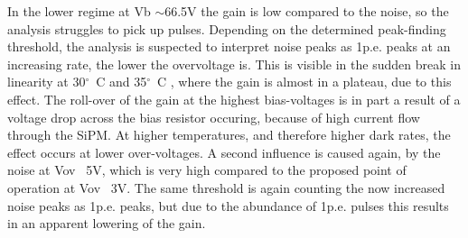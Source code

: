 \documentclass[12pt,article,type=msc,colorback,accentcolor=tud9c]{tudthesis}
\begin{document}
In the lower regime at Vb $\sim$66.5V the gain is low compared to the noise, so the analysis struggles to pick up pulses. Depending on the determined peak-finding threshold, the analysis is suspected to interpret noise peaks as 1p.e. peaks at an increasing rate, the lower the overvoltage is. This is visible in the sudden break in linearity at 30$^{\circ}$~C and 35$^{\circ}$~C , where the gain is almost in a plateau, due to this effect. The roll-over of the gain at the highest bias-voltages is in part a result of a voltage drop across the bias resistor occuring, because of high current flow through the SiPM. At higher temperatures, and therefore higher dark rates, the effect occurs at lower over-voltages. A second influence is caused again, by the noise at Vov ~5V, which is very high compared to the proposed point of operation at Vov ~3V. The same threshold is again counting the now increased noise peaks as 1p.e. peaks, but due to the abundance of 1p.e. pulses this results in an apparent lowering of the gain.



\end{document}
